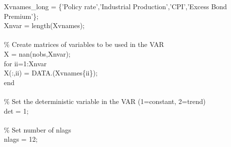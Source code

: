 \hspace{1mm}\hspace{5mm} Xvnames\_long = \{\textcolor{matlabpurple}{'Policy rate'},\textcolor{matlabpurple}{'Industrial Production'},\textcolor{matlabpurple}{'CPI'},\textcolor{matlabpurple}{'Excess Bond Premium'}\}; \\ 
\hspace{1mm}\hspace{5mm} Xnvar        = length(Xvnames); \\ 
\hspace{1mm}\hspace{5mm}  \\ 
\hspace{1mm}\hspace{5mm} \textcolor{matlabgreen}{\% Create matrices of variables to be used in the VAR }\\ 
\hspace{1mm}\hspace{5mm} X = nan(nobs,Xnvar); \\ 
\hspace{1mm}\hspace{5mm} \textcolor{matlabblue}{for} ii=1:Xnvar \\ 
\hspace{1mm}\hspace{5mm} \hspace{5mm} X(:,ii) = DATA.(Xvnames\{ii\}); \\ 
\hspace{1mm}\hspace{5mm} \textcolor{matlabblue}{end} \\ 
\hspace{1mm}\hspace{5mm}  \\ 
\hspace{1mm}\hspace{5mm} \textcolor{matlabgreen}{\% Set the deterministic variable in the VAR (1=constant, 2=trend) }\\ 
\hspace{1mm}\hspace{5mm} det = 1; \\ 
\hspace{1mm}\hspace{5mm}  \\ 
\hspace{1mm}\hspace{5mm} \textcolor{matlabgreen}{\% Set number of nlags }\\ 
\hspace{1mm}\hspace{5mm} nlags = 12; \\ 
